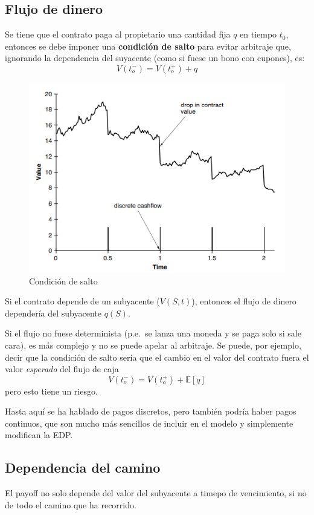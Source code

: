 \subsection{Flujo de dinero}
Se tiene que el contrato paga al propietario una cantidad fija $q$ en tiempo $t_0$, entonces se debe imponer una \textbf{condición de salto} para evitar arbitraje que, ignorando la dependencia del suyacente (como si fuese un bono con cupones), es:
\[
    \boxed{V(t_o^-) = V(t_o^+) + q}
\]
\begin{figure}[H]
    \centering
    \includegraphics[width=0.65\linewidth]{Imagenes/Parte2/17_Clas_exot_path_ops/Jump_Condition.png}
    \caption{Condición de salto}
\end{figure}

Si el contrato depende de un subyacente ($V(S,t)$), entonces el flujo de dinero dependería del subyacente $q(S)$.

Si el flujo no fuese determinista (p.e.\ se lanza una moneda y se paga solo si sale cara), es más complejo y no se puede apelar al arbitraje. Se puede, por ejemplo, decir que la condición de salto sería que el cambio en el valor del contrato fuera el valor \textit{esperado} del flujo de caja
\[
    V(t_o^-) = V(t_o^+) + \mathbb{E}[q]
\]
pero esto tiene un riesgo.

Hasta aquí se ha hablado de pagos discretos, pero también podría haber pagos continuos, que son mucho más sencillos de incluir en el modelo y simplemente modifican la EDP.





\subsection{Dependencia del camino}
El payoff no solo depende del valor del subyacente a timepo de vencimiento, si no de todo el camino que ha recorrido.


